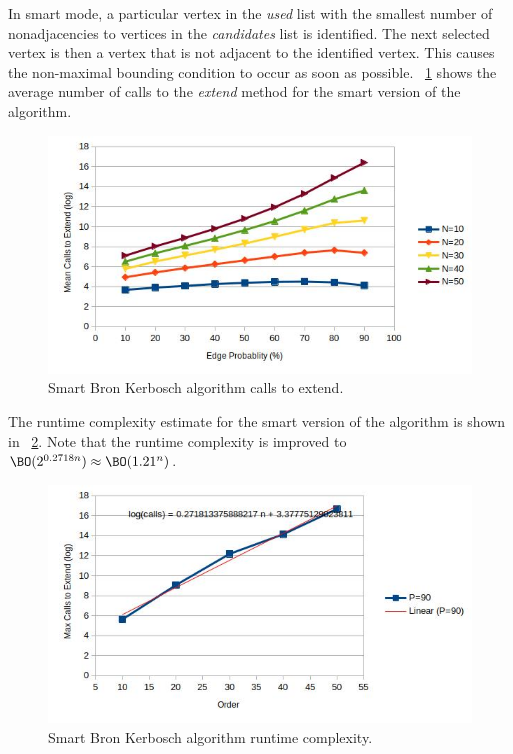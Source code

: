 In smart mode, a particular vertex in the \emph{used} list with the smallest number of nonadjacencies to vertices
in the \emph{candidates} list is identified.  The next selected vertex is then a vertex that is not adjacent to the
identified vertex.  This causes the non-maximal bounding condition to occur as soon as possible.
\figurename~\ref{fig:bron2:calls} shows the average number of calls to the \emph{extend} method for the smart
version of the algorithm.

\begin{figure}[H]
  \centering
  \includegraphics[width=5in]{bron1_calls}
  \caption{Smart Bron Kerbosch algorithm calls to extend.}
  \label{fig:bron2:calls}
\end{figure}

The runtime complexity estimate for the smart version of the algorithm is shown in
\figurename~\ref{fig:bron2:runtime}.  Note that the runtime complexity is improved to
\(\BO(2^{0.2718n})\approx\BO(1.21^n)\).

\begin{figure}[H]
  \centering
  \includegraphics[width=5in]{bron2_runtime}
  \caption{Smart Bron Kerbosch algorithm runtime complexity.}
  \label{fig:bron2:runtime}
\end{figure}

